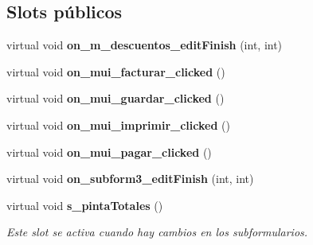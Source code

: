 \subsection*{Slots p\'{u}blicos}
\begin{CompactItemize}
\item 
virtual void {\bf on\_\-m\_\-descuentos\_\-edit\-Finish} (int, int)\label{classPedidoProveedorView_i0}

\item 
virtual void {\bf on\_\-mui\_\-facturar\_\-clicked} ()\label{classPedidoProveedorView_i1}

\item 
virtual void {\bf on\_\-mui\_\-guardar\_\-clicked} ()\label{classPedidoProveedorView_i2}

\item 
virtual void {\bf on\_\-mui\_\-imprimir\_\-clicked} ()\label{classPedidoProveedorView_i3}

\item 
virtual void {\bf on\_\-mui\_\-pagar\_\-clicked} ()\label{classPedidoProveedorView_i4}

\item 
virtual void {\bf on\_\-subform3\_\-edit\-Finish} (int, int)\label{classPedidoProveedorView_i5}

\item 
virtual void {\bf s\_\-pinta\-Totales} ()\label{classPedidoProveedorView_i6}

\begin{CompactList}\small\item\em Este slot se activa cuando hay cambios en los subformularios. \item\end{CompactList}\end{CompactItemize}
